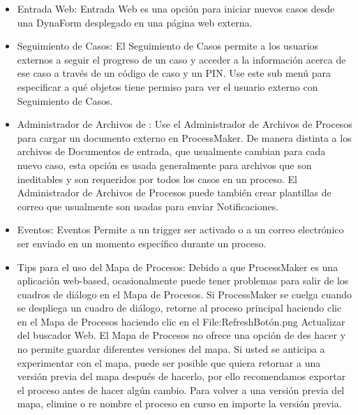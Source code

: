 \begin{itemize}
\item Entrada Web: Entrada Web es una opción para iniciar nuevos casos desde una DynaForm desplegado en una página web externa.

\item Seguimiento de Casos: El Seguimiento de Casos permite a los usuarios externos a seguir el progreso de un caso y acceder a la información acerca de ese caso a través de un código de caso y un PIN. Use este sub menú para especificar a qué objetos tiene permiso para ver el usuario externo con Seguimiento de Casos.

\item Administrador de Archivos de : Use el Administrador de Archivos de Procesos para cargar un documento externo en ProcessMaker. De manera distinta a los archivos de Documentos de entrada, que usualmente cambian para cada nuevo caso, esta opción es usada generalmente para archivos que son ineditables y son requeridos por todos los casos en un proceso. El Administrador de Archivos de Procesos puede también crear plantillas de correo que usualmente son usadas para enviar Notificaciones.

\item Eventos: Eventos Permite a un trigger ser activado o a un correo electrónico ser enviado en un momento específico durante un proceso.
\item Tips para el uso del Mapa de Procesos:
Debido a que ProcessMaker es una aplicación web-based, ocasionalmente puede tener problemas para salir de los cuadros de diálogo en el Mapa de Procesos. Si ProcessMaker se cuelga cuando se despliega un cuadro de diálogo, retorne al proceso principal haciendo clic en el Mapa de Procesos haciendo clic en el 
File:RefreshBotón.png Actualizar del buscador Web.
El Mapa de Procesos no ofrece una opción de des hacer y no permite guardar diferentes versiones del mapa. Si usted se anticipa a experimentar con el mapa, puede ser posible que quiera retornar a una versión previa del mapa después de hacerlo, por ello recomendamos exportar el proceso antes de hacer algún cambio. Para volver a una versión previa del mapa, elimine o re nombre el proceso en curso en importe la versión previa.

\end{itemize}